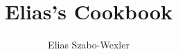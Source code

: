 \documentclass[
a4paper,
11pt
]{article}
\begin{document}
\title{Elias's Cookbook}
\author{Elias Szabo-Wexler}
\maketitle

\tableofcontents










\end{document}
